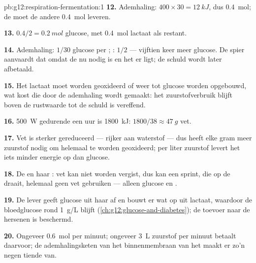 \begin{solution}{pb:g12:respiration-fermentation:1}
\textbf{12.} Ademhaling: $400 \times 30 = \qty{12}{kJ}$, dus
\qty{0.4}{mol}; de  moet de andere \qty{0.4}{mol} leveren.

\textbf{13.} $0.4/2 = \qty{0.2}{mol}$ glucose, met \qty{0.4}{mol}
lactaat als restant.

\textbf{14.} Ademhaling: $1/30$ glucose per ; : $1/2$
--- vijftien keer meer glucose. De spier aanvaardt dat omdat de  nu
nodig is en het  er ligt; de schuld wordt later afbetaald.

\textbf{15.} Het lactaat moet worden geoxideerd of weer tot glucose worden
opgebouwd, wat  kost die door de ademhaling wordt gemaakt: het
zuurstofverbruik blijft boven de rustwaarde tot de schuld is vereffend.

\textbf{16.} \qty{500}{W} gedurende een uur is \qty{1800}{kJ}: $1800/38
\approx \qty{47}{g}$ vet.

\textbf{17.} Vet is sterker gereduceerd --- rijker aan waterstof --- dus
heeft elke gram meer zuurstof nodig om helemaal te worden geoxideerd; per
liter zuurstof levert het iets minder energie op dan glucose.

\textbf{18.} De  en haar : vet kan niet worden vergist,
dus kan een sprint, die op de  draait, helemaal geen vet gebruiken
--- alleen glucose en .

\textbf{19.} De lever geeft glucose uit haar  af en bouwt er wat
op uit lactaat, waardoor de bloedglucose rond \qty{1}{g/L} blijft
(\cref{ch:g12:glucose-and-diabetes}); de toevoer naar de hersenen is
beschermd.

\textbf{20.} Ongeveer \qty{0.6}{mol}  per minuut; ongeveer
\qty{3}{L} zuurstof per minuut betaalt daarvoor; de ademhalingsketen van
het binnenmembraan van het  maakt er zo'n negen tiende van.
\end{solution}
